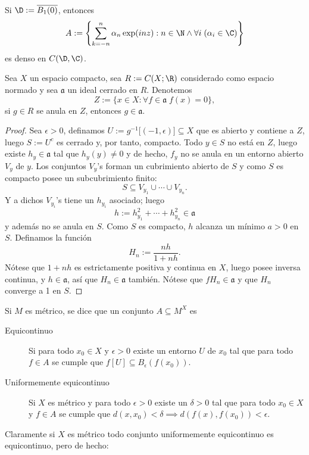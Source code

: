 \documentclass[topologia-analisis.tex]{subfiles}
\begin{document}
\begin{cor}
	Si $\D := \overline{ B_1(0) }$, entonces
	$$ A := \left\{ \sum_{k = -n}^n \alpha_n\exp(inz) : n\in\N\wedge\forall i\;(\alpha_i\in\C) \right\} $$
	es denso en $C(\D, \C)$.
\end{cor}

\begin{thm}
	Sea $X$ un espacio compacto, sea $R := C(X; \R)$ considerado como espacio normado y sea $\mathfrak{a}$ un ideal cerrado en $R$.
	Denotemos
	$$ Z := \{ x\in X : \forall f\in \mathfrak{a} \; f(x) = 0 \}, $$
	si $g \in R$ se anula en $Z$, entonces $g \in \mathfrak{a}$.
\end{thm}
\begin{proof}
	Sea $\epsilon > 0$, definamos $U := g^{-1}\big[ (-1, \epsilon) \big] \subseteq X$ que es abierto y contiene a $Z$,
	luego $S := U^c$ es cerrado y, por tanto, compacto.
	Todo $y \in S$ no está en $Z$, luego existe $h_y \in \mathfrak{a}$ tal que $h_y(y) \ne 0$ y de hecho,
	$f_y$ no se anula en un entorno abierto $V_y$ de $y$.
	Los conjuntos $V_y$'s forman un cubrimiento abierto de $S$ y como $S$ es compacto posee un subcubrimiento finito:
	$$ S \subseteq V_{y_1} \cup \cdots \cup V_{y_n}. $$
	Y a dichos $V_{y_i}$'s tiene un $h_{y_i}$ asociado; luego
	$$ h := h^2_{y_1} + \cdots + h^2_{y_n} \in \mathfrak{a} $$
	y además no se anula en $S$.
	Como $S$ es compacto, $h$ alcanza un mínimo $a > 0$ en $S$.
	Definamos la función
	$$ H_n := \frac{nh}{1 + nh}. $$
	Nótese que $1 + nh$ es estrictamente positiva y continua en $X$, luego posee inversa continua,
	y $h \in \mathfrak{a}$, así que $H_n \in \mathfrak{a}$ también.
	Nótese que $fH_n \in \mathfrak{a}$ y que $H_n$ converge a 1 en $S$.
\end{proof}

\begin{mydef}
	Si $M$ es métrico, se dice que un conjunto $A\subseteq M^X$ es
	\begin{description}
		\item[Equicontinuo] Si para todo $x_0\in X$ y $\epsilon > 0$ existe un entorno $U$ de $x_0$ tal que para todo $f\in A$
			se cumple que $f[U] \subseteq B_\epsilon(f(x_0))$.
		\item[Uniformemente equicontinuo] Si $X$ es métrico y para todo $\epsilon > 0$ existe un $\delta > 0$ tal que para todo $x_0\in X$
			y $f\in A$ se cumple que $d(x, x_0) < \delta \implies d(f(x), f(x_0)) < \epsilon$.
	\end{description}
\end{mydef}
Claramente si $X$ es métrico todo conjunto uniformemente equicontinuo es equicontinuo, pero de hecho:
\end{document}
